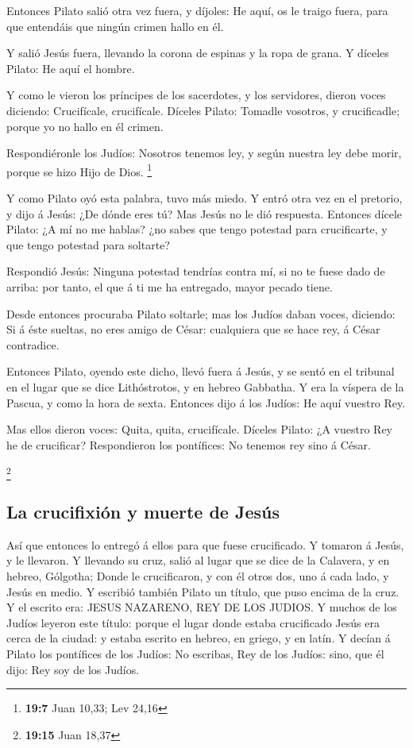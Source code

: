  Entonces Pilato salió otra vez fuera, y díjoles: He aquí,
os le traigo fuera, para que entendáis que ningún crimen hallo en él.

 Y salió Jesús fuera, llevando la corona de espinas y la
ropa de grana. Y díceles Pilato: He aquí el hombre.

 Y como le vieron los príncipes de los sacerdotes, y los
servidores, dieron voces diciendo: Crucifícale, crucifícale. Díceles
Pilato: Tomadle vosotros, y crucificadle; porque yo no hallo en él
crimen.

 Respondiéronle los Judíos: Nosotros tenemos ley, y según
nuestra ley debe morir, porque se hizo Hijo de Dios. \footnote{\textbf{19:7}
  Juan 10,33; Lev 24,16}

 Y como Pilato oyó esta palabra, tuvo más miedo.
 Y entró otra vez en el pretorio, y dijo á Jesús: ¿De
dónde eres tú? Mas Jesús no le dió respuesta.  Entonces
dícele Pilato: ¿A mí no me hablas? ¿no sabes que tengo potestad para
crucificarte, y que tengo potestad para soltarte?

 Respondió Jesús: Ninguna potestad tendrías contra mí, si
no te fuese dado de arriba: por tanto, el que á ti me ha entregado,
mayor pecado tiene.

 Desde entonces procuraba Pilato soltarle; mas los Judíos
daban voces, diciendo: Si á éste sueltas, no eres amigo de César:
cualquiera que se hace rey, á César contradice.

 Entonces Pilato, oyendo este dicho, llevó fuera á Jesús,
y se sentó en el tribunal en el lugar que se dice Lithóstrotos, y en
hebreo Gabbatha.  Y era la víspera de la Pascua, y como
la hora de sexta. Entonces dijo á los Judíos: He aquí vuestro Rey.

 Mas ellos dieron voces: Quita, quita, crucifícale.
Díceles Pilato: ¿A vuestro Rey he de crucificar? Respondieron los
pontífices: No tenemos rey sino á César.

\footnote{\textbf{19:15} Juan 18,37}

\hypertarget{la-crucifixiuxf3n-y-muerte-de-jesuxfas}{%
\subsection{La crucifixión y muerte de
Jesús}\label{la-crucifixiuxf3n-y-muerte-de-jesuxfas}}

 Así que entonces lo entregó á ellos para que fuese
crucificado. Y tomaron á Jesús, y le llevaron.  Y
llevando su cruz, salió al lugar que se dice de la Calavera, y en
hebreo, Gólgotha;  Donde le crucificaron, y con él otros
dos, uno á cada lado, y Jesús en medio.  Y escribió
también Pilato un título, que puso encima de la cruz. Y el escrito era:
JESUS NAZARENO, REY DE LOS JUDIOS.  Y muchos de los
Judíos leyeron este título: porque el lugar donde estaba crucificado
Jesús era cerca de la ciudad: y estaba escrito en hebreo, en griego, y
en latín.  Y decían á Pilato los pontífices de los
Judíos: No escribas, Rey de los Judíos: sino, que él dijo: Rey soy de
los Judíos.

